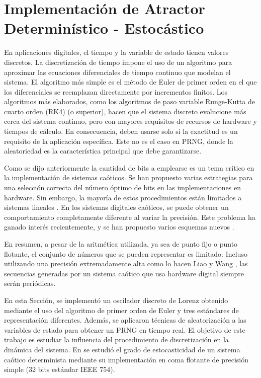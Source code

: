 \section{Implementación de Atractor Determinístico - Estocástico}
\label{sec:AnalysisImpLorenz}

En aplicaciones digitales, el tiempo y la variable de estado tienen valores discretos.
La discretización de tiempo impone el uso de un algoritmo para aproximar las ecuaciones diferenciales de tiempo continuo que modelan el sistema.
El algoritmo más simple es el método de Euler de primer orden en el que los diferenciales se reemplazan directamente por incrementos finitos.
Los algoritmos más elaborados, como los algoritmos de paso variable Runge-Kutta de cuarto orden (RK4) (o superior), hacen que el sistema discreto evolucione más cerca del sistema continuo, pero con mayores requisitos de recursos de hardware y tiempos de cálculo.
En consecuencia, deben usarse solo si la exactitud es un requisito de la aplicación específica.
Este no es el caso en PRNG, donde la aleatoriedad es la característica principal que debe garantizarse.

Como se dijo anteriormente la cantidad de bits a emplearse es un tema crítico en la implementación de sistemas caóticos. Se han propuesto varias estrategias para una selección correcta del número óptimo de bits en las implementaciones en hardware.
Sin embargo, la mayoría de estos procedimientos están limitados a sistemas lineales \cite{Constantinides2002, Constantinides2003}.
En los sistemas digitales caóticos, se puede obtener un comportamiento completamente diferente al variar la precisión.
Este problema ha ganado interés recientemente, y se han propuesto varios esquemas nuevos \cite{Ding2007, Asseri2002, Azzaz2009}.

En resumen, a pesar de la aritmética utilizada, ya sea de punto fijo o punto flotante, el conjunto de números que se pueden representar es limitado.
Incluso utilizando una precisión extremadamente alta como lo hacen Liao y Wang \cite{Liao2013a}, las secuencias generadas por un sistema caótico que usa hardware digital siempre serán periódicas.

En esta Sección, se implementó un oscilador discreto de Lorenz obtenido mediante el uso del algoritmo de primer orden de Euler y tres estándares de representación diferentes.
Además, se aplicaron técnicas de aleatorización a las variables de estado para obtener un PRNG en tiempo real.
El objetivo de este trabajo es estudiar la influencia del procedimiento de discretización en la dinámica del sistema.
En \cite{DeMicco2010} se estudió el grado de estocasticidad de un sistema caótico determinista mediante su implementación en coma flotante de precisión simple (32 bits estándar IEEE 754).

